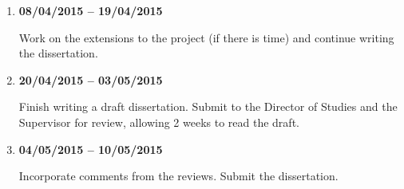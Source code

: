 \documentclass[12pt,a4]{article}
\begin{document}
\begin{enumerate}
\item {\bf 08/04/2015 -- 19/04/2015}

Work on the extensions to the project (if there is time) and continue writing the dissertation.

\item {\bf 20/04/2015 -- 03/05/2015}

Finish writing a draft dissertation. Submit to the Director of Studies and the Supervisor for review, allowing 2 weeks to read the draft.

\item {\bf 04/05/2015 -- 10/05/2015}

Incorporate comments from the reviews. Submit the dissertation.

\end{enumerate}



\end{document}
